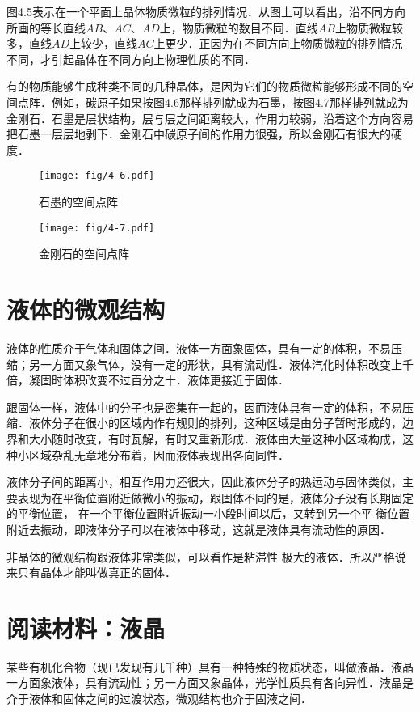 图4.5表示在一个平面上晶体物质微粒的排列情况．从图上可以看出，沿不同方向所画的等长直线$AB$、$AC$、$AD$上，物质微粒的数目不同．直线$AB$上物质微粒较多，直线$AD$上较少，直线$AC$上更少．正因为在不同方向上物质微粒的排列情况不同，才引起晶体在不同方向上物理性质的不同．

有的物质能够生成种类不同的几种晶体，是因为它们的物质微粒能够形成不同的空间点阵．例如，碳原子如果按图4.6那样排列就成为石墨，按图4.7那样排列就成为金刚石．石墨是层状结构，层与层之间距离较大，作用力较弱，沿着这个方向容易把石墨一层层地剥下．金刚石中碳原子间的作用力很强，所以金刚石有很大的硬度．
\begin{figure}[htp]\centering
\texttt{[image: fig/4-6.pdf]}
\caption{石墨的空间点阵}
\end{figure}

\begin{figure}[htp]\centering
\texttt{[image: fig/4-7.pdf]}
\caption{金刚石的空间点阵}
\end{figure}

\section{液体的微观结构}
液体的性质介于气体和固体之间．液体一方面象固体，具有一定的体积，不易压缩；另一方面又象气体，没有一定的形状，具有流动性．液体汽化时体积改变上千倍，凝固时体积改变不过百分之十．液体更接近于固体．

跟固体一样，液体中的分子也是密集在一起的，因而液体具有一定的体积，不易压缩．液体分子在很小的区域内作有规则的排列，这种区域是由分子暂时形成的，边界和大小随时改变，有时瓦解，有时又重新形成．液体由大量这种小区域构成，这种小区域杂乱无章地分布着，因而液体表现出各向同性．

液体分子间的距离小，相互作用力还很大，因此液体分子的热运动与固体类似，主要表现为在平衡位置附近做微小的振动，跟固体不同的是，液体分子没有长期固定的平衡位置，
在一个平衡位置附近振动一小段时间以后，又转到另一个平
衡位置附近去振动，即液体分子可以在液体中移动，这就是液体具有流动性的原因．

非晶体的微观结构跟液体非常类似，可以看作是粘滞性
极大的液体．所以严格说来只有晶体才能叫做真正的固体．

\section*{阅读材料：液晶}
某些有机化合物（现已发现有几千种）具有一种特殊的物质状态，叫做液晶．液晶一方面象液体，具有流动性；另一方面又象晶体，光学性质具有各向异性．液晶是介于液体和固体之间的过渡状态，微观结构也介于固液之间．

